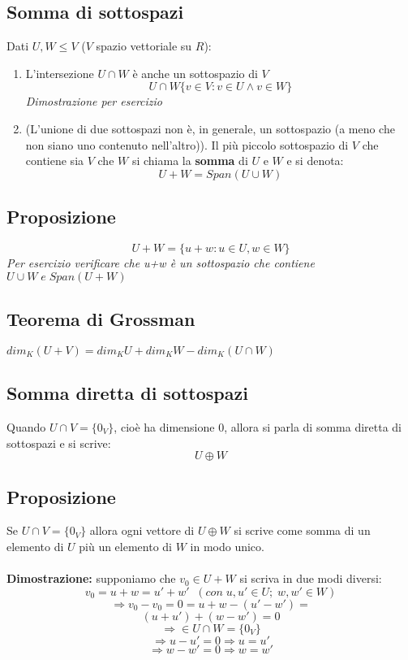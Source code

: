\subsection{Somma di sottospazi}
Dati $U,W\leq V$ ($V$ spazio vettoriale su $R$):
\begin{enumerate}
	\item L'intersezione $U\cap W$ è anche un sottospazio di $V$
	\[U\cap W\{v\in V: v\in U\land v\in W\}\]
	\textit{Dimostrazione per esercizio}
	\item (L'unione di due sottospazi non è, in generale, un sottospazio (a meno che non siano uno contenuto nell'altro)).
	Il più piccolo sottospazio di $V$ che contiene sia $V$ che $W$ si chiama la \textbf{somma} di $U$ e $W$ e si denota:
	\[U+W=Span(U\cup W)\]
\end{enumerate}

\subsection{Proposizione}
\[U+W=\{u+w: u\in U,w\in W\}\]
\textit{Per esercizio verificare che u+w è un sottospazio che contiene $U\cup W\;e\;Span(U+W)$}

\subsection{Teorema di Grossman}
$dim_K(U+V)=dim_KU+dim_KW-dim_K(U\cap W)$

\subsection{Somma diretta di sottospazi}
Quando $U\cap V=\{0_V\}$, cioè ha dimensione $0$, allora si parla di somma diretta di sottospazi e si scrive:
\[U\oplus W\]

\subsection{Proposizione}
Se $U\cap V=\{0_V\}$ allora ogni vettore di $U\oplus W$ si scrive come somma di un elemento di $U$ più un elemento di $W$ in modo unico.
\\
\\\textbf{Dimostrazione:} supponiamo che $v_0\in U+W$ si scriva in due modi diversi:
\[v_0=u+w=u'+w'\;\;(con\;u,u'\in U;\;w,w'\in W)\]
\[\Rightarrow v_0-v_0=0=u+w-(u'-w')=\]
\[(u+u')+(w-w')=0\]
\[\Rightarrow \in U\cap W=\{0_V\}\]
\[\Rightarrow u-u'=0\Rightarrow u=u'\]
\[\Rightarrow w-w'=0\Rightarrow w=w'\]
